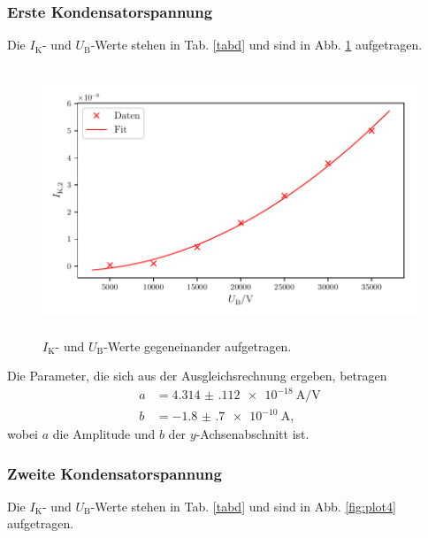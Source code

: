 \subsubsection{Erste Kondensatorspannung}
Die $I_\text{K}$- und $U_\text{B}$-Werte stehen in Tab. \ref{tabd} und sind in Abb. \ref{fig:plot3} aufgetragen. 



\begin{figure}
    \centering
    \includegraphics[width=15cm, height=8cm]{build/plot3.pdf}
    \caption{$I_\text{K}$- und $U_\text{B}$-Werte gegeneinander aufgetragen.}
    \label{fig:plot3}
\end{figure}

\noindent Die Parameter, die sich aus der Ausgleichsrechnung ergeben, betragen
\begin{align*}
    a &= \SI{4.314(112)e-18}{\ampere\per\volt}\\
    b &= \SI{-1.8(7)e-10}{\ampere},
\end{align*}
wobei $a$ die Amplitude und $b$ der $y$-Achsenabschnitt ist. 

\subsubsection{Zweite Kondensatorspannung}
Die $I_\text{K}$- und $U_\text{B}$-Werte stehen in Tab. \ref{tabd} und sind in Abb. \ref{fig:plot4} aufgetragen. 

